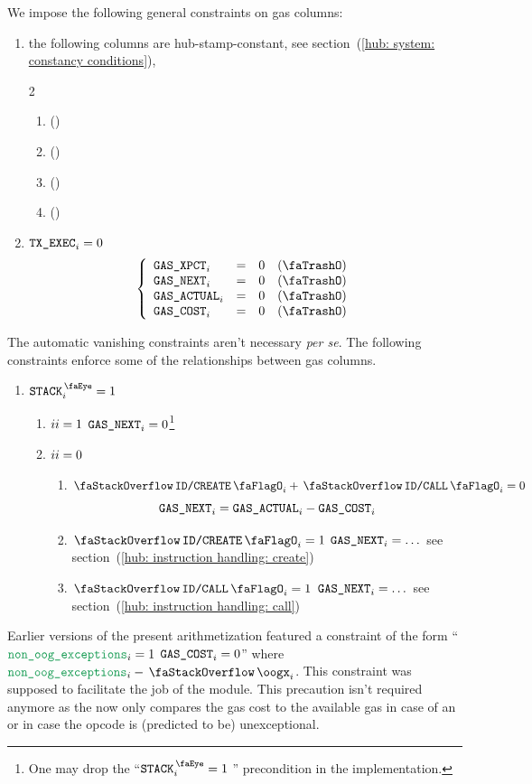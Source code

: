 We impose the following general constraints on gas columns:
\begin{enumerate}
	\item the following columns are hub-stamp-constant, see section~(\ref{hub: system: constancy conditions}),
		\begin{multicols}{2}
			\begin{enumerate}
				\item \gasExpected{} \quad (\sanityCheck)
				\item \gasNext{}     \quad (\sanityCheck)
				\item \gasActual{}   \quad (\sanityCheck)
				\item \gasCost{}     \quad (\sanityCheck)
			\end{enumerate}
		\end{multicols}
	\item \If $\texttt{TX}\texttt{\_EXEC} _{i} = 0$ \Then
		\[
			\left\{ \begin{array}{lclr}
				\gasExpected _{i} & = & 0 & (\trash) \\
				\gasNext     _{i} & = & 0 & (\trash) \\
				\gasActual   _{i} & = & 0 & (\trash) \\
				\gasCost     _{i} & = & 0 & (\trash) \\
			\end{array} \right.
		\]
\end{enumerate}
The automatic vanishing constraints aren't necessary \emph{per se}.
The following constraints enforce some of the relationships between gas columns.
\begin{enumerate}[resume]
	\item \If $\peekStack _{i} = 1$ \Then
		\begin{enumerate}
			\item \If $\xAhoy_{i} = 1$ \Then $\texttt{GAS}\texttt{\_NEXT}_{i} = 0$\footnote{One may drop the ``\If $\peekStack _{i} = 1$ \Then'' precondition in the implementation.}
			\item \If $\xAhoy_{i} = 0$ \Then
				\begin{enumerate}
					\item \If $\stackDecCreateFlag _{i} + \stackDecCallFlag _{i} = 0$ \Then
						\[ \texttt{GAS}\texttt{\_NEXT}_{i} = \texttt{GAS}\texttt{\_ACTUAL}_{i} - \texttt{GAS}\texttt{\_COST}_{i} \]
					\item \If $\stackDecCreateFlag _{i} = 1$ \Then $\texttt{GAS}\texttt{\_NEXT}_{i} = \dots$ see section~(\ref{hub: instruction handling: create})
					\item \If $\stackDecCallFlag   _{i} = 1$ \Then $\texttt{GAS}\texttt{\_NEXT}_{i} = \dots$ see section~(\ref{hub: instruction handling: call})
				\end{enumerate}
		\end{enumerate}
\end{enumerate}
\saNote{}
Earlier versions of the present arithmetization featured a constraint of the form
``\If $\locNonOogExceptions _{i} = 1$ \Then $\texttt{GAS}\texttt{\_COST} _{i} = 0$''
where $\locNonOogExceptions _{i} \def \xAhoy _{i} - \stackOogx_{i}$.
This constraint was supposed to facilitate the job of the \gasMod{} module.
This precaution isn't required anymore as the \gasMod{} now only compares the gas cost to the available gas in case of an \oogxSH{} or in case the opcode is (predicted to be) unexceptional.


